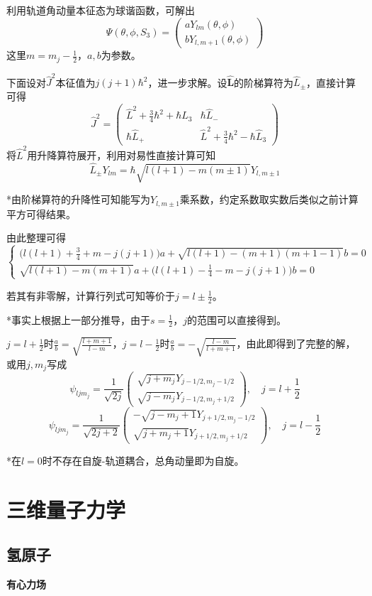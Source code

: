 \documentclass[a4paper,UTF8,fontset=windows]{ctexart}
\newcommand*{\bl}{\mathbf{L}}
\begin{document}
利用轨道角动量本征态为球谐函数，可解出
$$\Psi(\theta,\phi,S_3)=\begin{pmatrix}aY_{lm}(\theta,\phi)\\bY_{l,m+1}(\theta,\phi)\end{pmatrix}$$
这里$m=m_j-\frac{1}{2}$，$a,b$为参数。

下面设对$\hat{J}^2$本征值为$j(j+1)\hbar^2$，进一步求解。设$\hat{\bl}$的阶梯算符为$\hat{L}_\pm$，直接计算可得
$$\hat{J}^2=\begin{pmatrix}\hat{L}^2+\frac{3}{4}\hbar^2+\hbar\hat{L}_3&\hbar\hat{L}_-\\\hbar\hat{L}_+&\hat{L}^2+\frac{3}{4}\hbar^2-\hbar\hat{L}_3\end{pmatrix}$$
将$\hat{L}^2$用升降算符展开，利用对易性直接计算可知
$$\hat{L}_\pm Y_{lm}=\hbar\sqrt{l(l+1)-m(m\pm 1)}Y_{l,m\pm 1}$$

*由阶梯算符的升降性可知能写为$Y_{l,m\pm 1}$乘系数，约定系数取实数后类似之前计算平方可得结果。

由此整理可得
$$\begin{cases}\bigg(l(l+1)+\frac{3}{4}+m-j(j+1)\bigg)a+\sqrt{l(l+1)-(m+1)(m+1-1)}b=0\\\sqrt{l(l+1)-m(m+1)}a+\bigg(l(l+1)-\frac{1}{4}-m-j(j+1)\bigg)b=0\end{cases}$$

若其有非零解，计算行列式可知等价于$j=l\pm\frac{1}{2}$。

*事实上根据上一部分推导，由于$s=\frac{1}{2}$，$j$的范围可以直接得到。

$j=l+\frac{1}{2}$时$\frac{a}{b}=\sqrt{\frac{l+m+1}{l-m}}$，$j=l-\frac{1}{2}$时$\frac{a}{b}=-\sqrt{\frac{l-m}{l+m+1}}$，由此即得到了完整的解，或用$j,m_j$写成
$$\psi_{ljm_j}=\frac{1}{\sqrt{2j}}\begin{pmatrix}\sqrt{j+m_j}Y_{j-1/2,m_j-1/2}\\\sqrt{j-m_j}Y_{j-1/2,m_j+1/2}\end{pmatrix},\quad j=l+\frac{1}{2}$$
$$\psi_{ljm_j}=\frac{1}{\sqrt{2j+2}}\begin{pmatrix}-\sqrt{j-m_j+1}Y_{j+1/2,m_j-1/2}\\\sqrt{j+m_j+1}Y_{j+1/2,m_j+1/2}\end{pmatrix},\quad j=l-\frac{1}{2}$$

*在$l=0$时不存在自旋-轨道耦合，总角动量即为自旋。

\section{三维量子力学}
\subsection{氢原子}
\textbf{有心力场}
\end{document}
